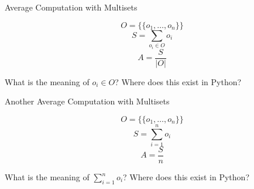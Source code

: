 \documentclass[14pt,aspectratio=169]{beamer}
\begin{document}
%
\begin{frame}{Average Computation with Multisets}
  \vspace*{-.5in}
  \begin{center}
  \fontsize{20}{30}\selectfont
    \begin{equation*}
     O = \{\!\{o_1, \ldots, o_n\}\!\}
    \end{equation*}
    \begin{equation*}
      S = \sum_{o_i \in O} o_i
    \end{equation*}
    \begin{equation*}
      A = \frac{S}{|O|}
    \end{equation*}
  \end{center}
  \vspace{2ex}
  \begin{center}
    \small What is the meaning of $o_i \in O$? Where does this exist in Python?
  \end{center}
\end{frame}

%
\begin{frame}{Another Average Computation with Multisets}
  \vspace*{-.5in}
  \begin{center}
  \fontsize{20}{30}\selectfont
    \begin{equation*}
     O = \{\!\{o_1, \ldots, o_n\}\!\}
    \end{equation*}
    \begin{equation*}
      S = \sum_{i=1}^{n} o_i
    \end{equation*}
    \begin{equation*}
      A = \frac{S}{n}
    \end{equation*}
  \end{center}
  \vspace{2ex}
  \begin{center}
    \small What is the meaning of $\sum_{i=1}^{n} o_i$? Where does this exist in Python?
  \end{center}
\end{frame}
\end{document}
